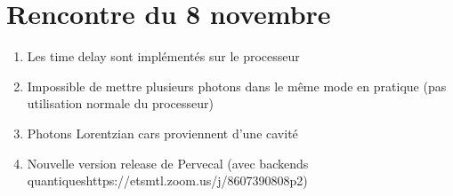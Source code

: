 \documentclass[letterpaper,12pt,oneside,final]{article}
\begin{document}
\section*{Rencontre du 8 novembre}
\begin{enumerate}
    \item Les time delay sont implémentés sur le processeur
    \item Impossible de mettre plusieurs photons dans le même mode en pratique (pas utilisation normale du processeur)
    \item Photons Lorentzian cars proviennent d'une cavité
    \item Nouvelle version release de Pervecal (avec backends quantiqueshttps://etsmtl.zoom.us/j/8607390808p2)
\end{enumerate}
\end{document}
